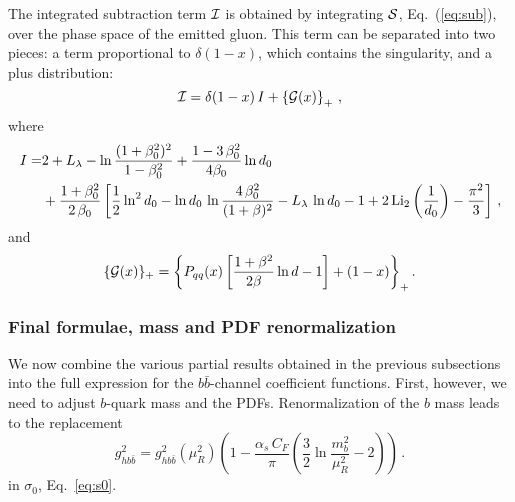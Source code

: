 The integrated subtraction term ${\cal I}$ is obtained by
integrating  ${\cal S}$, Eq.~(\ref{eq:sub}),  over the phase space of
the emitted gluon. This term can be separated into two pieces: a term
proportional to 
$\delta(1-x)$, which contains the singularity,
and a plus distribution:
\begin{equation}
  {\cal I} = \delta(1-x)\,I + \left\{ {\cal G}(x) \right\}_+\,,
\end{equation}
where
\begin{equation}
  \begin{split}
    I  = &2 +L_{\lambda}- \ln{\frac{(1+\beta_0^2)^2}{1-\beta_0^2}} +
    \frac{1-3\,\beta_0^2}{4\beta_0}\ln d_0\\
     &+\frac{1+\beta_0^2}{2\,\beta_0}
    \left[
      \frac{1}{2}\ln^2 d_0
      -\ln d_0\,\ln {\frac{4\,\beta_0^2}{(1+\beta)^2}}
      - L_{\lambda}\,\ln d_0 -1
      +2\,{\rm Li}_2\left(\frac{1}{d_0} \right)-\frac{\pi^2}{3}
    \right]\,,
  \end{split}
\end{equation}
and
\begin{equation}
  \{{\cal G}(x)\}_+ =  {\left\{P_{qq}(x)\left[ \frac{1+\beta^2}{2\beta}
        \ln{d} -1 \right] +
      \left( 1-x \right)\right\}}_{+}\,.
\end{equation}

\subsubsection{Final formulae, mass and PDF renormalization}
We now combine the various partial results obtained in the previous
subsections  into the  full expression for the $b\bar{b}$-channel
coefficient functions. First, however, we need to adjust 
$b$-quark mass and the PDFs.
Renormalization of the  $b$ mass leads to the   replacement
\begin{equation}
  g_{hb\bar{b}}^2 = g_{hb\bar{b}}^2(\mu_R^2) \left(
    1-\frac{\alpha_s\,C_F}{\pi}\left(
        \frac{3}{2}\ln\frac{m_b^2}{\mu_R^2}-2  \right) \right)\,.
\end{equation}
in $\sigma_0$, Eq.~\eqref{eq:s0}.

